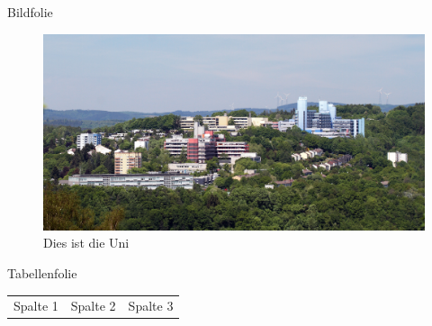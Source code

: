 \documentclass[aspectratio=169]{beamer}
\begin{document}
\begin{frame}{Bildfolie}
	\begin{figure}
		\includegraphics[height=.5\textheight]{img/progress.jpg}
		\caption{Dies ist die Uni}
	\end{figure}
\end{frame}

\begin{frame}{Tabellenfolie}
	\begin{table}
		\begin{tabular}{l | l | l}
			\rowcolor{unigrau}
			
			Spalte 1 & Spalte 2 & Spalte 3\\
		\end{tabular}
	\end{table}
\end{frame}
\end{document}
